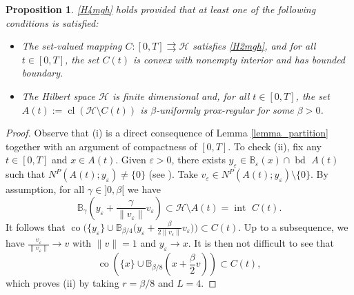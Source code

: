 \documentclass[preprint,12pt]{elsarticle}
\renewcommand{\epsilon}{\varepsilon}
\renewcommand{\H}{\mathcal{H}}
\newcommand{\tto}{\rightrightarrows}
\newcommand{\cl}{{\operatorname{cl}}}
\newcommand{\inte}{{\operatorname{int \  }}}
\newcommand{\bd}{{\operatorname{bd \ }}}
\theoremstyle{plain}
\newtheorem{proposition}[theorem]{Proposition}
\theoremstyle{definition}
\theoremstyle{remark}
\begin{document}
\begin{proposition}\label{rmk-pr-cpr}
     \ref{H4mgh} holds provided that at least one of the following conditions is satisfied:
    \begin{itemize}
        \item[(i)] The set-valued mapping $C\colon [0,T]\tto \H$ satisfies \ref{H2mgh}, and for all $t\in [0,T]$, the set $C(t)$ is convex with nonempty interior and has bounded boundary.
        \item[(ii)] The Hilbert space $\H$ is finite dimensional and, for all $t\in [0,T]$,  the set $A(t):=\cl(\H\setminus C(t))$ is $\beta$-uniformly prox-regular for some $\beta>0$.
    \end{itemize}
\end{proposition}
\begin{proof}
Observe that (i) is a direct consequence of Lemma \ref{lemma_partition} together with an argument of compactness of $[0,T]$. To check (ii), fix any $t\in [0,T]$ and $x\in A(t)$. Given $\epsilon>0$, there exists $y_\epsilon\in \mathbb{B}_{\epsilon}(x)\cap \bd A(t)$ such that $N^P(A(t);y_\epsilon) \neq\{0\}$ (see \cite[Corollary 1.6.2]{Clarke1998}). Take $v_\epsilon\in N^P(A(t);y_\epsilon)\setminus \{0\}$. By assumption, for all $\gamma\in ]0,\beta[$ we have 
		\begin{equation*}
			\mathbb{B}_{\gamma}\left(y_\epsilon+\frac{\gamma}{\|v_\epsilon\|}v_\epsilon\right)\subset \H\setminus A(t) = \inte C(t).
		\end{equation*}
		It follows that $\operatorname{co}\big(\{y_\epsilon\}\cup \mathbb{B}_{\beta/4}\big(y_\epsilon+\frac{\beta}{2\|v_\epsilon\|}v_\epsilon\big)\big)\subset C(t)$. Up to a subsequence, we have $\frac{v_\epsilon}{\|v_\epsilon\|}\to v$ with $\|v\| = 1$ and $y_\epsilon\to x$. It is then not difficult to see that $$\operatorname{co}\left(\{x\}\cup \mathbb{B}_{\beta/8}\left(x+\frac{\beta}{2}v\right)\right)\subset C(t),$$
		which proves (ii) by taking $r = \beta/8$ and $L=4$.
\end{proof}
\end{document}
